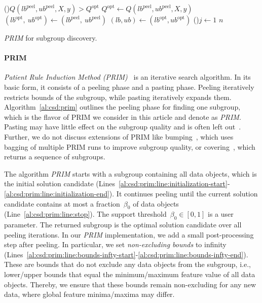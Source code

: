 \documentclass{article}
\theoremstyle{definition}
\begin{document}
\begin{algorithm}[p]
{		\If(){$Q(\mathit{lb}^{\text{peel}}, \mathit{ub}^{\text{peel}}, X, y) > Q^{\text{opt}}$}{ \label{al:csd:prim:line:opt-check-start}
			$Q^{\text{opt}} \leftarrow Q(\mathit{lb}^{\text{peel}}, \mathit{ub}^{\text{peel}}, X, y)$\;
			$(\mathit{lb}^{\text{opt}},~ \mathit{ub}^{\text{opt}}) \leftarrow (\mathit{lb}^{\text{peel}},~ \mathit{ub}^{\text{peel}})$\; \label{al:csd:prim:line:opt-check-end} \label{al:csd:prim:iteration-end}
		}
	}
	$(\mathit{lb}, \mathit{ub}) \leftarrow (\mathit{lb}^{\text{opt}}, \mathit{ub}^{\text{opt}})$\;
	\For(){$j \leftarrow 1$ \KwTo $n$}{ \label{al:csd:prim:line:bounds-infty-start}
		 \label{al:csd:prim:line:bounds-infty-end}
	}
	\caption{\emph{PRIM} for subgroup discovery.}
	\label{al:csd:prim}
\end{algorithm}

\paragraph{PRIM}

\emph{Patient Rule Induction Method (PRIM)}~\cite{friedman1999bump} is an iterative search algorithm.
In its basic form, it consists of a peeling phase and a pasting phase.
Peeling iteratively restricts bounds of the subgroup, while pasting iteratively expands them.
Algorithm~\ref{al:csd:prim} outlines the peeling phase for finding one subgroup, which is the flavor of PRIM we consider in this article and denote as \emph{PRIM}.
Pasting may have little effect on the subgroup quality and is often left out~\cite{arzamasov2021reds}.
Further, we do not discuss extensions of PRIM like bumping~\cite{friedman1999bump, kwakkel2016improving}, which uses bagging of multiple PRIM runs to improve subgroup quality, or covering~\cite{friedman1999bump}, which returns a sequence of subgroups.

The algorithm \emph{PRIM} starts with a subgroup containing all data objects, which is the initial solution candidate (Lines~\ref{al:csd:prim:line:initialization-start}-\ref{al:csd:prim:line:initialization-end}).
It continues peeling until the current solution candidate contains at most a fraction~$\beta_0$ of data objects (Line~\ref{al:csd:prim:line:stop}).
The support threshold~$\beta_0 \in [0, 1]$ is a user parameter.
The returned subgroup is the optimal solution candidate over all peeling iterations.
In our \emph{PRIM} implementation, we add a small post-processing step after peeling.
In particular, we set \emph{non-excluding bounds} to infinity (Lines~\ref{al:csd:prim:line:bounds-infty-start}-\ref{al:csd:prim:line:bounds-infty-end}).
These are bounds that do not exclude any data objects from the subgroup, i.e., lower/upper bounds that equal the minimum/maximum feature value of all data objects.
Thereby, we ensure that these bounds remain non-excluding for any new data, where global feature minima/maxima may differ.
\end{document}
